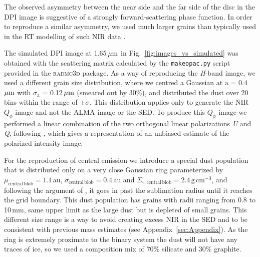 \documentclass[fleqn,usenatbib,useAMS]{mnras}
\begin{document}
The observed asymmetry between the near side and the far side of the disc in the DPI image is suggestive of a strongly forward-scattering phase function. In order to reproduce a similar asymmetry, we used much larger grains than typically used in the RT modelling of such NIR data \citep[e.g.,][]{2018MNRAS.477.5104C}.

The simulated DPI image at 1.65\,$\hbox{$\mu$m}$ in Fig.~\ref{fig:images_vs_simulated} was obtained with the scattering matrix calculated by the {\tt makeopac.py} script provided in the \textsc{radmc3d} package. As a way of reproducing the \textit{H}-band image, we used a different grain size distribution, where we centred a Gaussian at $\mathrm{a}$ = 0.4\,$\hbox{$\mu$m}$ with $\sigma_{\mathrm{a}}$ = 0.12\,$\hbox{$\mu$m}$ (smeared out by 30\%), and distributed the dust over 20 bins within the range of $\pm \sigma$. This distribution applies only to generate the NIR $Q_\phi$ image and not the ALMA image or the SED. To produce this $Q_\phi$ image we performed a linear combination of the two orthogonal linear polarizations \textit{U} and \textit{Q}, following \citet{Avenhaus_2017}, which gives a representation of an unbiased estimate of the polarized intensity image.

For the reproduction of central emission we introduce a special dust population that is distributed only on a very close Gaussian ring parameterized by $\mu_{\mathrm{central\,blob}}=1.1$\,au, $\sigma_{\mathrm{central\,blob}}=0.4$\,au and $\Sigma_{\circ,\mathrm{central\,blob}}=2.4\,\mathrm{g\,cm^{-3}}$, and following the argument of \citet{Francis_2020}, it goes in past the sublimation radius until it reaches the grid boundary. This dust population has grains with radii ranging from 0.8 to 10\,mm, same upper limit as the large dust but is depleted of small grains. This different size range is a way to avoid creating excess NIR in the SED and to be consistent with previous mass estimates (see Appendix~\ref{sec:Appendix}). As the ring is extremely proximate to the binary system the dust will not have any traces of ice, so we used a composition mix of 70\% silicate and 30\% graphite.
\end{document}
